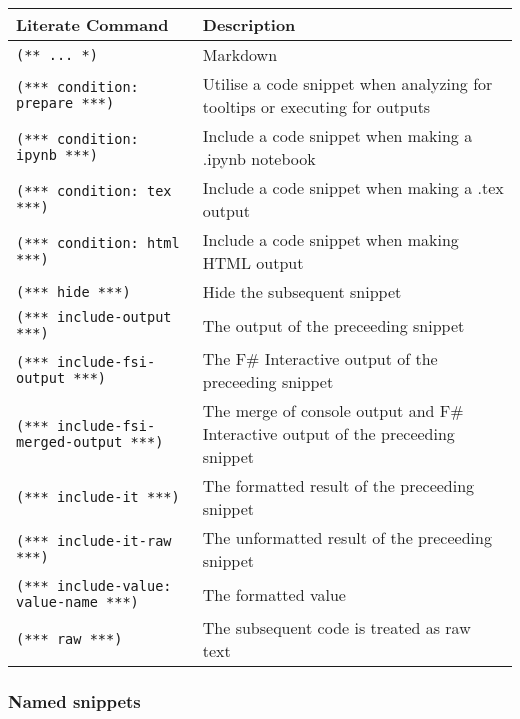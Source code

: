 \documentclass{article}
\begin{document}
\begin{tabular}{|l|l|}\hline
\textbf{Literate Command} & \textbf{Description}\\ \hline\hline
\texttt{(** ... *)} & Markdown\\ \hline
\texttt{(*** condition: prepare ***)} & Utilise a code snippet when analyzing for tooltips or executing for outputs\\ \hline
\texttt{(*** condition: ipynb ***)} & Include a code snippet when making a .ipynb notebook\\ \hline
\texttt{(*** condition: tex ***)} & Include a code snippet when making a .tex output\\ \hline
\texttt{(*** condition: html ***)} & Include a code snippet when making HTML output\\ \hline
\texttt{(*** hide ***)} & Hide the subsequent snippet\\ \hline
\texttt{(*** include-output ***)} & The output of the preceeding snippet\\ \hline
\texttt{(*** include-fsi-output ***)} & The F\# Interactive output of the preceeding snippet\\ \hline
\texttt{(*** include-fsi-merged-output ***)} & The merge of console output and F\# Interactive output of the preceeding snippet\\ \hline
\texttt{(*** include-it ***)} & The formatted result of the preceeding snippet\\ \hline
\texttt{(*** include-it-raw ***)} & The unformatted result of the preceeding snippet\\ \hline
\texttt{(*** include-value: value-name ***)} & The formatted value\\ \hline
\texttt{(*** raw ***)} & The subsequent code is treated as raw text\\ \hline
\end{tabular}

\subsubsection*{Named snippets}
\end{document}
